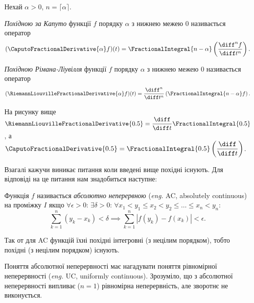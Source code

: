 Нехай $\alpha > 0$, $n = \lceil \alpha \rceil$. 

\begin{definition}
    \textit{Похідною за Капуто} функції $f$ порядку $\alpha$ з нижнею межею $0$ називається оператор
    \begin{equation}
        (\CaputoFractionalDerivative{\alpha} f)(t) = \FractionalIntegral{n - \alpha} \left( \frac{\diff^n f}{\diff t^n} \right).
    \end{equation}
\end{definition}
\begin{definition}
    \textit{Похідною Рімана-Ліувілля} функції $f$ порядку $\alpha$ з нижнею межею $0$ називається оператор
    \begin{equation}
        (\RiemannLiouvilleFractionalDerivative{\alpha} f)(t) = \frac{\diff^n}{\diff t^n} \left( \FractionalIntegral{n - \alpha} f \right).
    \end{equation}
\end{definition}

\begin{example}
    На рисунку вище $\RiemannLiouvilleFractionalDerivative{0.5} = \dfrac{\diff}{\diff t} \FractionalIntegral{0.5}$, а $\CaputoFractionalDerivative{0.5} = \FractionalIntegral{0.5} \left( \dfrac{\diff}{\diff t} \right)$.
\end{example}

Взагалі кажучи виникає питання коли введені вище похідні існують. Для відповіді на це питання нам знадобиться наступне:
\begin{definition}
    Функція $f$ називається \textit{абсолютно неперервною} (\textit{eng.} AC, absolutely continuous) на проміжку $I$ якщо $\forall \epsilon > 0$: $\exists \delta > 0$: $\forall x_1 < y_1 \le x_2 < y_2 \le \ldots \le x_n < y_n$: 
    \begin{equation}
        \sum_{k = 1}^n (y_k - x_k) < \delta \implies \sum_{k = 1}^n |f(y_k) - f(x_k)| < \epsilon.
    \end{equation}
\end{definition}

Так от для AC функцій їхні похідні інтегровні (з нецілим порядком), тобто похідні (з нецілим порядком) існують. \medskip

Поняття абсолютної неперервності має нагадувати поняття рівномірної неперервності (\textit{eng.} UC, uniformly continuous). Зрозуміло, що з абсолютної неперервності випливає ($n = 1$) рівномірна неперервність, але зворотнє не виконується. 

